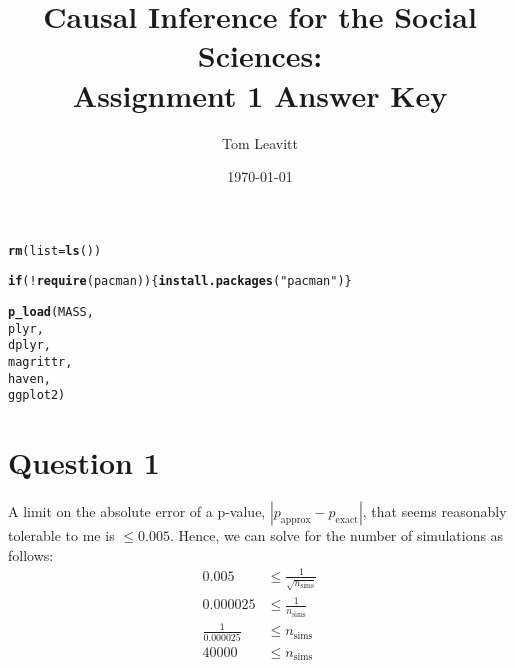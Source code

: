 \documentclass[11pt]{article}\usepackage[]{graphicx}\usepackage[]{color}
\makeatletter
\newcommand{\hlstr}[1]{\textcolor[rgb]{0.192,0.494,0.8}{#1}}%
\newcommand{\hlopt}[1]{\textcolor[rgb]{0,0,0}{#1}}%
\newcommand{\hlstd}[1]{\textcolor[rgb]{0.345,0.345,0.345}{#1}}%
\newcommand{\hlkwa}[1]{\textcolor[rgb]{0.161,0.373,0.58}{\textbf{#1}}}%
\newcommand{\hlkwc}[1]{\textcolor[rgb]{0.333,0.667,0.333}{#1}}%
\newcommand{\hlkwd}[1]{\textcolor[rgb]{0.737,0.353,0.396}{\textbf{#1}}}%
\newenvironment{kframe}{%
 \def\at@end@of@kframe{}%
 \ifinner\ifhmode%
  \def\at@end@of@kframe{\end{minipage}}%
  \begin{minipage}{\columnwidth}%
 \fi\fi%
 \def\FrameCommand##1{\hskip\@totalleftmargin \hskip-\fboxsep
 \colorbox{shadecolor}{##1}\hskip-\fboxsep
     \hskip-\linewidth \hskip-\@totalleftmargin \hskip\columnwidth}%
 \MakeFramed {\advance\hsize-\width
   \@totalleftmargin\z@ \linewidth\hsize
   \@setminipage}}%
 {\par\unskip\endMakeFramed%
 \at@end@of@kframe}
\newenvironment{knitrout}{}{} %
\theoremstyle{newstyle}
\makeatother
\begin{document}
\begin{titlepage}
\title{Causal Inference for the Social Sciences: \\
Assignment 1 Answer Key}
\author{Tom Leavitt}
\date{\today}
\maketitle

\end{titlepage}
\tableofcontents
\clearpage

\doublespacing

\maketitle

\begin{knitrout}
\color{fgcolor}\begin{kframe}
\begin{alltt}
\hlkwd{rm}\hlstd{(}\hlkwc{list}\hlstd{=}\hlkwd{ls}\hlstd{())}

\hlkwa{if}\hlstd{(}\hlopt{!}\hlkwd{require}\hlstd{(pacman)) \{}\hlkwd{install.packages}\hlstd{(}\hlstr{"pacman"}\hlstd{)\}}
\end{alltt}


{\ttfamily\noindent\itshape\color{messagecolor}{\#\# Loading required package: pacman}}\begin{alltt}
\hlkwd{p_load}\hlstd{(MASS,}
       \hlstd{plyr,}
       \hlstd{dplyr,}
       \hlstd{magrittr,}
       \hlstd{haven,}
       \hlstd{ggplot2)}
\end{alltt}
\end{kframe}
\end{knitrout}

\section{Question 1}

A limit on the absolute error of a p-value, $\left|p_{\text{approx}} - p_{\text{exact}}\right|$, that seems reasonably tolerable to me is $\leq 0.005$. Hence, we can solve for the number of simulations as follows:
\begin{align*}
0.005 & \leq \frac{1}{\sqrt{n_{\text{sims}}}} \\
0.000025 & \leq \frac{1}{n_{\text{sims}}} \\
\frac{1}{0.000025} & \leq n_{\text{sims}} \\
40000 & \leq n_{\text{sims}}
\end{align*}
\end{document}
